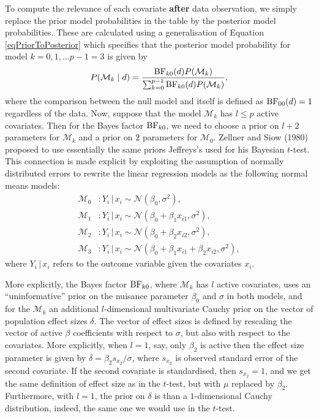 \documentclass[english,,doc,floatsintext]{apa6}
\begin{document}
To compute the relevance of each covariate \textbf{after} data observation, we simply replace the prior model probabilities in the table by the posterior model probabilities. These are calculated using a generalisation of Equation \eqref{eqPriorToPosterior} which specifies that the posterior model probability for model \(k=0, 1, \ldots p-1 = 3\) is given by
\begin{equation}
\label{eqPriorToPosteriorGeneral}
P(\mathcal{M}_{k} \mid d) = \frac{ \textnormal{BF}_{k0}(d) P(\mathcal{M}_{k})}{ \sum_{k=0}^{p-1} \textnormal{BF}_{k0}(d) P(\mathcal{M}_{k})},
\end{equation}
where the comparison between the null model and itself is defined as \(\textnormal{BF}_{00}(d) = 1\) regardless of the data. Now, suppose that the model \(\mathcal{M}_{k}\) has \(l \leq p\) active covariates. Then for the Bayes factor \(\textnormal{BF}_{k0}\), we need to choose a prior on \(l + 2\) parameters for \(\mathcal{M}_{k}\) and a prior on \(2\) parameters for \(\mathcal{M}_{0}\). Zellner and Siow (1980) proposed to use essentially the same priors Jeffreys's used for his Bayesian \(t\)-test. This connection is made explicit by exploiting the assumption of normally distributed errors to rewrite the linear regression models as the following normal means models:
\begin{align}
\label{eqLinRegAsNormal0}
\mathcal{M}_{0} & : Y_{i} \, | \, x_{i} \sim \mathcal{N}(\beta_{0}, \sigma^{2}), \\
\mathcal{M}_{1} & : Y_{i} \, | \, x_{i} \sim \mathcal{N}(\beta_{0} + \beta_{1} x_{i1}, \sigma^{2}), \\
\mathcal{M}_{2} & : Y_{i} \, | \, x_{i} \sim \mathcal{N}(\beta_{0} + \beta_{2} x_{i2}, \sigma^{2}), \\
\label{eqLinRegAsNormal3}
\mathcal{M}_{3} & : Y_{i} \, | \, x_{i} \sim \mathcal{N}(\beta_{0} + \beta_{1} x_{i1} + \beta_{2} x_{i2} , \sigma^{2}), 
\end{align}
where \(Y_{i} \, | \, x_{i}\) refers to the outcome variable given the covariates \(x_{i}\).

More explicitly, the Bayes factor \(\textnormal{BF}_{k0}\), where \(\mathcal{M}_{k}\) has \(l\) active covariates, uses an ``uninformative'' prior on the nuisance parameter \(\beta_{0}\) and \(\sigma\) in both models, and for the \(\mathcal{M}_{k}\) an additional \(l\)-dimensional multivariate Cauchy prior on the vector of population effect sizes \(\delta\). The vector of effect sizes is defined by rescaling the vector of active \(\beta\) coefficients with respect to \(\sigma\), but also with respect to the covariates. More explicitly, when \(l=1\), say, only \(\beta_{2}\) is active then the effect size parameter is given by \(\delta = \beta_{2} s_{x_{2}}/\sigma\), where \(s_{x_{2}}\) is observed standard error of the second covariate. If the second covariate is standardised, then \(s_{x_{2}} = 1\), and we get the same definition of effect size as in the \(t\)-test, but with \(\mu\) replaced by \(\beta_{2}\). Furthermore, with \(l = 1\), the prior on \(\delta\) is than a \(1\)-dimensional Cauchy distribution, indeed, the same one we would use in the \(t\)-test.
\end{document}
